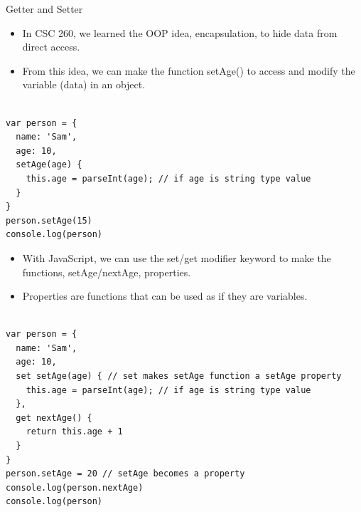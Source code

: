 \begin{frame}[fragile]{Getter and Setter}

\begin{itemize}
	\item In CSC 260, we learned the OOP idea, encapsulation, to hide data from direct access. 
	\item From this idea, we can make the function setAge() to access and modify the variable (data) in an object. 
\end{itemize}

\begin{Code}{}%
\begin{lstlisting}[firstnumber=1, label=glabels, xleftmargin=0pt, basicstyle=\scriptsize]% 

var person = {
  name: 'Sam',
  age: 10,
  setAge(age) {
    this.age = parseInt(age); // if age is string type value
  }
}
person.setAge(15)
console.log(person)
\end{lstlisting}%
\end{Code}%

\end{frame}

\begin{frame}[fragile]{}

\begin{itemize}
	\item With JavaScript, we can use the set/get modifier keyword to make the functions, setAge/nextAge, properties. 
	\item Properties are functions that can be used as if they are variables. 
\end{itemize}

\begin{Code}{}%
\begin{lstlisting}[firstnumber=1, label=glabels, xleftmargin=0pt, basicstyle=\scriptsize]% 

var person = {
  name: 'Sam',
  age: 10,
  set setAge(age) { // set makes setAge function a setAge property
    this.age = parseInt(age); // if age is string type value
  },
  get nextAge() {
    return this.age + 1
  }
}
person.setAge = 20 // setAge becomes a property
console.log(person.nextAge)
console.log(person)
\end{lstlisting}%
\end{Code}%


\end{frame}
